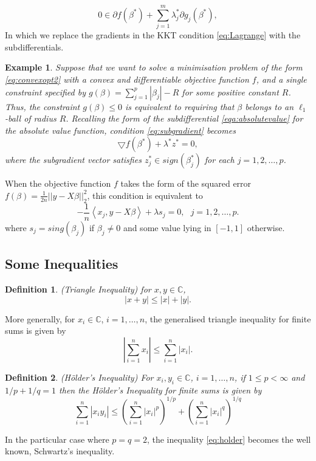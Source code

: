 \documentclass[a4paper,12pt,openany]{report}
\theoremstyle{plain}
\theoremstyle{plain}
\theoremstyle{plain}
\theoremstyle{plain}
\theoremstyle{plain}
\theoremstyle{plain}
\theoremstyle{plain}
\newtheorem{definition}{\textbf{Definition}}[section]
\theoremstyle{plain}
\newtheorem{example}{\textbf{Example}}[section]
\theoremstyle{plain}
\theoremstyle{plain}
\theoremstyle{plain}
\theoremstyle{plain}
\begin{document}
\begin{equation}\label{eq:subgradient}
0 \in\partial f(\beta^*) + \sum_{j=1}^{m}\lambda_j^*\partial g_j(\beta^*),
\end{equation}
In which we replace the gradients in the KKT condition \eqref{eq:Lagrange} with the subdifferentials.
\begin{example}
	Suppose that we want to solve a minimisation problem of the form \eqref{eq:convexopt2} with a convex and differentiable objective function $f$, and a single constraint specified by $g(\beta) = \sum_{j=1}^{p}|\beta_j| - R$ for some positive constant $R$. Thus, the constraint $g(\beta)\leq 0$ is equivalent to requiring that $\beta$ belongs to an $\ell_1$-ball of radius $R$. Recalling the form of the subdifferential \eqref{eqa:absolutevalue} for the absolute value function, condition \eqref{eq:subgradient} becomes
	\begin{equation}
	\bigtriangledown f(\beta^*) + \lambda^*z^* = 0,
	\end{equation}
	where the subgradient vector satisfies $z_j^*\in sign(\beta_j^*)$ for each $j=1,2,\ldots,p$.
\end{example}
When the objective function $f$ takes the form of the squared error $f(\beta) = \frac{1}{2n}||y-X\beta||_2^2$, this condition is equivalent to
\begin{equation}
-\frac{1}{n}\left\langle x_j, y-X\beta\right\rangle + \lambda s_j=0, \ \ \ j=1,2,\ldots,p.
\end{equation}
where $s_j= sing(\beta_j)$ if $\beta_j\neq 0$ and some value lying in $\left[-1,1\right]$ otherwise.
\subsection{Some Inequalities}
\begin{definition}(Triangle Inequality)
for $x, y\in\mathbb{C}$,
\begin{equation}
|x+y|\leq |x|+|y|.
\end{equation}	
\end{definition}
More generally, for $x_i\in\mathbb{C}$, $i=1,\ldots,n$, the generalised triangle inequality for finite sums is given by
\begin{equation}
\left|\sum_{i=1}^{n}x_i\right| \leq \sum_{i=1}^{n}|x_i|.
\end{equation}
\begin{definition}(H\"{o}lder's Inequality)
	For $x_i, y_i\in\mathbb{C}$, $i=1,\ldots,n$, if $1\leq p<\infty$ and $1/p + 1/q = 1$ then the H\"{o}lder's Inequality for finite sums is given by
	\begin{equation}\label{eq:holder}
	\sum_{i=1}^{n}|x_iy_i| \leq \left(\sum_{i=1}^{n}|x_i|^p\right)^{1/p} +\left(\sum_{i=1}^{n}|x_i|^q\right)^{1/q}
	\end{equation}
\end{definition}
In the particular case where $p=q=2$, the inequality \eqref{eq:holder} becomes the well known, Schwartz's inequality.
\end{document}
